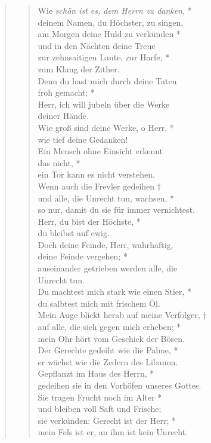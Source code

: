 \vspace{0.3cm}


\begin{quote}
\begin{verse}
Wie \textit{schön ist es, dem Herrn zu danken,} *\\
deinem Namen, du Höchster, zu singen, \\
\vin am Morgen deine Huld zu verkünden *\\
\vin und in den Nächten deine Treue\\
zur zehnsaitigen Laute, zur Harfe, *\\
zum Klang der Zither.\\
\vin Denn du hast mich durch deine Taten\\ \vin froh gemacht; *\\
\vin Herr, ich will jubeln über die Werke\\ deiner Hände.\\
Wie groß sind deine Werke, o Herr, *\\
wie tief deine Gedanken! \\
\vin Ein Mensch ohne Einsicht erkennt \\ \vin das nicht, *\\
\vin ein Tor kann es nicht verstehen. \\
Wenn auch die Frevler gedeihen †\\
und alle, die Unrecht tun, wachsen, *\\ so nur, damit du sie für immer vernichtest.\\
\vin Herr, du bist der Höchste, *\\
\vin du bleibst auf ewig.\\
Doch deine Feinde, Herr, wahrhaftig,\\ deine Feinde vergehen; *\\
auseinander getrieben werden alle, die\\ Unrecht tun. \\
\vin Du machtest mich stark wie einen Stier, *\\
\vin du salbtest mich mit frischem Öl.\\
Mein Auge blickt herab auf meine Verfolger, †\\
auf alle, die sich gegen mich erheben; *\\ mein Ohr hört vom Geschick der Bösen. \\
\vin Der Gerechte gedeiht wie die Palme, *\\
\vin er wächst wie die Zedern des Libanon. \\
Gepflanzt im Haus des Herrn, *\\
gedeihen sie in den Vorhöfen unseres Gottes. \\
\vin Sie tragen Frucht noch im Alter *\\
\vin und bleiben voll Saft und Frische;\\
sie verkünden: Gerecht ist der Herr; *\\
mein Fels ist er, an ihm ist kein Unrecht. \\

\end{verse}
\end{quote}



